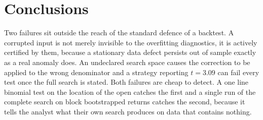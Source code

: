 \documentclass[10pt]{article}
\begin{document}
\section{Conclusions}

Two failures sit outside the reach of the standard defence of a backtest. A corrupted input
is not merely invisible to the overfitting diagnostics, it is actively certified by them,
because a stationary data defect persists out of sample exactly as a real anomaly does. An
undeclared search space causes the correction to be applied to the wrong denominator and a
strategy reporting $t=3.09$ can fail every test once the full search is stated. Both
failures are cheap to detect. A one line binomial test on the location of the open catches
the first and a single run of the complete search on block bootstrapped returns catches the
second, because it tells the analyst what their own search produces on data that contains
nothing.

\end{document}

